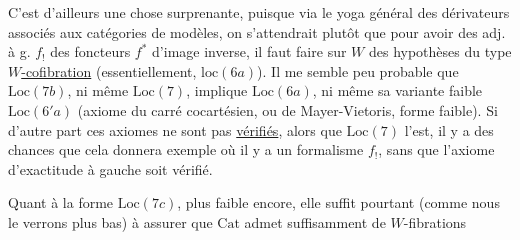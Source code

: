 C'est d'ailleurs une chose surprenante,
puisque via le yoga général des dérivateurs
associés aux catégories de modèles, on s'attendrait plutôt que pour avoir des adj. à g.
$f_!$ des foncteurs $f^*$ d'image inverse, il faut
faire sur $W$ des hypothèses du type
\uline{$W$-cofibration}  (essentiellement, $\mathrm{loc}(6a)$).
Il me semble peu probable que  $\mathrm{Loc}(7b)$,
ni même $\mathrm{Loc}(7)$, implique $\mathrm{Loc}(6a)$, ni
même sa variante  faible $\mathrm{Loc}(6'a)$ (axiome
du carré cocartésien, ou de Mayer-Vietoris,
forme faible).  Si d'autre
part ces axiomes ne sont pas \uline{vérifiés}, alors
que $\mathrm{Loc}(7)$ l'est, il y a des chances que
cela donnera  exemple  où il
y a un formalisme  $f_!$, sans que
l'axiome d'exactitude à gauche soit
vérifié.

Quant à la forme $\mathrm{Loc}(7c)$, plus faible
encore, elle suffit pourtant (comme nous
le verrons plus bas) à assurer que
$\mathrm{Cat}$ admet suffisamment de $W$-fibrations
